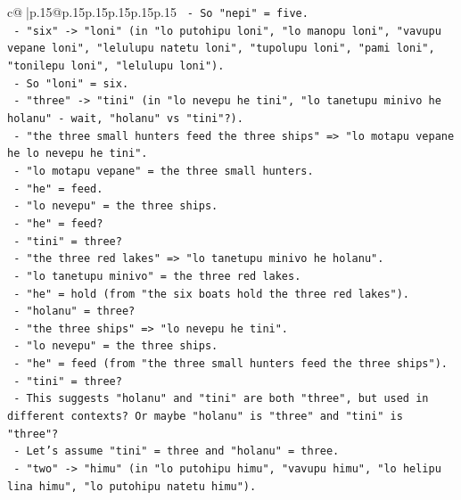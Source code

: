\documentclass{article}
\begin{document}
{\begin{supertabular}{c@{$\;$}|p{.15\linewidth}@{}p{.15\linewidth}p{.15\linewidth}p{.15\linewidth}p{.15\linewidth}p{.15\linewidth}}
{{{\texttt{            {-} So "nepi" = five.} \\
\texttt{            {-} "six" {-}> "loni" (in "lo putohipu loni", "lo manopu loni", "vavupu vepane loni", "lelulupu natetu loni", "tupolupu loni", "pami loni", "tonilepu loni", "lelulupu loni").} \\
\texttt{            {-} So "loni" = six.} \\
\texttt{            {-} "three" {-}> "tini" (in "lo nevepu he tini", "lo tanetupu minivo he holanu" {-} wait, "holanu" vs "tini"?).} \\
\texttt{            {-} "the three small hunters feed the three ships" => "lo motapu vepane he lo nevepu he tini".} \\
\texttt{              {-} "lo motapu vepane" = the three small hunters.} \\
\texttt{              {-} "he" = feed.} \\
\texttt{              {-} "lo nevepu" = the three ships.} \\
\texttt{              {-} "he" = feed?} \\
\texttt{              {-} "tini" = three?} \\
\texttt{            {-} "the three red lakes" => "lo tanetupu minivo he holanu".} \\
\texttt{              {-} "lo tanetupu minivo" = the three red lakes.} \\
\texttt{              {-} "he" = hold (from "the six boats hold the three red lakes").} \\
\texttt{              {-} "holanu" = three?} \\
\texttt{            {-} "the three ships" => "lo nevepu he tini".} \\
\texttt{              {-} "lo nevepu" = the three ships.} \\
\texttt{              {-} "he" = feed (from "the three small hunters feed the three ships").} \\
\texttt{              {-} "tini" = three?} \\
\texttt{            {-} This suggests "holanu" and "tini" are both "three", but used in different contexts? Or maybe "holanu" is "three" and "tini" is "three"?} \\
\texttt{            {-} Let's assume "tini" = three and "holanu" = three.} \\
\texttt{            {-} "two" {-}> "himu" (in "lo putohipu himu", "vavupu himu", "lo helipu lina himu", "lo putohipu natetu himu").} \\
}}}
\end{supertabular}}
\end{document}
